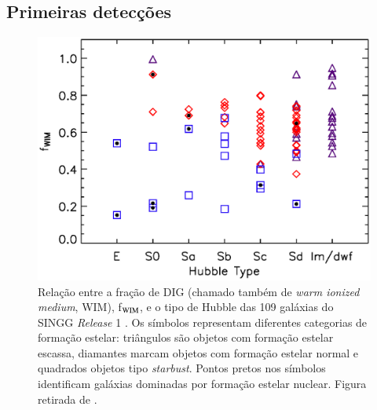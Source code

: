 \subsection{Primeiras detecções}
\label{sec:intro:DIG:first}
\begin{figure}
	\centering
	\includegraphics[scale=0.7]{figuras/Oey_etal_2007_f8.eps}
	\caption[SINGG: f$_{\rm WIM} \times$ tipo de Hubble]
	{Relação entre a fração de DIG (chamado também de {\em warm ionized medium}, WIM), f$_{\rm WIM}$, e o tipo de Hubble das 109 galáxias do SINGG {\em Release} 1 \citep[SR1][]{Meurer.etal.2006}. Os símbolos representam diferentes categorias de formação estelar: triângulos são objetos com formação estelar escassa, diamantes marcam objetos com formação estelar normal e quadrados objetos tipo {\em starbust}. Pontos pretos nos símbolos identificam galáxias dominadas por formação estelar nuclear. Figura retirada de \citet{Oey.etal.2007}.}
	\label{fig:Oey_f8}
\end{figure}

